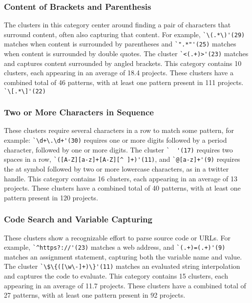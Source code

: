 \subsubsection{Content of Brackets and Parenthesis}
\label{cluster:contentparens}
The clusters in this category center around finding a pair of characters that surround content, often also capturing that content. For example,
\verb!`\(.*\)'(29)! matches when content is surrounded by parentheses and \verb!`".*"'(25)! matches  when content is surrounded by double quotes.  The cluster \verb!`<(.+)>'(23)! matches and captures content surrounded by angled brackets.
This category contains 10 clusters, each appearing in an average of 18.4 projects.
 These clusters have a combined total of 46 patterns, with at least one pattern present in 111 projects.
\verb!`\[.*\]'(22)!

\subsubsection{Two or More Characters in Sequence}
\label{cluster:multiple}
These clusters require several characters in a row to match some pattern, for example:
\verb!`\d+\.\d+'(30)! requires one or more digits followed by a period character, followed by one or more digits.  The cluster \verb!`  '(17)! requires two spaces in a row,
\verb!`([A-Z][a-z]+[A-Z][^ ]+)'(11)!,
and \verb!`@[a-z]+'(9)! requires the at symbol followed by two or more lowercase characters, as in a twitter handle.
This category contains 16 clusters, each appearing in an average of 13 projects.
These clusters have a combined total of 40 patterns, with at least one pattern present in 120 projects.


\subsubsection{Code Search and Variable Capturing}
\label{cluster:search}
These clusters show a recognizable effort to parse source code or URLs. For example,
\verb!`^https?://'(23)! matches a web address, and \verb!`(.+)=(.+)'(9)! matches an assignment statement, capturing both the variable name and value.
The cluster  \verb!`\$\{([\w\-]+)\}'(11)! matches an evaluated string interpolation and captures the code to evaluate.
This category contains 15 clusters, each appearing in an average of 11.7 projects.
These clusters have a combined total of 27 patterns, with at least one pattern present in 92 projects.

\vspace{6pt}
